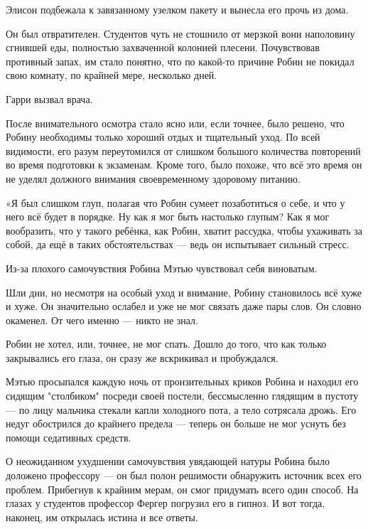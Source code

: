 \documentclass[a4paper,12pt]{book}
\begin{document}
\par
Элисон подбежала к завязанному узелком пакету и вынесла его прочь из дома.
\par
Он был отвратителен. Студентов чуть не стошнило от мерзкой вони наполовину сгнившей еды, полностью захваченной колонией плесени. Почувствовав противный запах, им стало понятно, что по какой-то причине Робин не покидал свою комнату, по крайней мере, несколько дней.
\par
Гарри вызвал врача.\\ 
\par
После внимательного осмотра стало ясно или, если точнее, было решено, что Робину необходимы только хороший отдых и тщательный уход. По всей видимости, его разум переутомился от слишком большого количества повторений во время подготовки к экзаменам. Кроме того, было похоже, что всё это время он не уделял должного внимания своевременному здоровому питанию.\\
\par
«Я был слишком глуп, полагая что Робин сумеет позаботиться о себе, и что у него всё будет в порядке. Ну как я мог быть настолько глупым? Как я мог вообразить, что у такого ребёнка, как Робин, хватит рассудка, чтобы ухаживать за собой, да ещё в таких обстоятельствах — ведь он испытывает сильный стресс.
\par
Из-за плохого самочувствия Робина Мэтью чувствовал себя виноватым.\\
\par
Шли дни, но несмотря на особый уход и внимание, Робину становилось всё хуже и хуже. Он значительно ослабел и уже не мог связать даже пары слов. Он словно окаменел. От чего именно — никто не знал.
\par
Робин не хотел, или, точнее, не мог спать. Дошло до того, что как только закрывались его глаза, он сразу же вскрикивал и пробуждался.
\par
Мэтью просыпался каждую ночь от пронзительных криков Робина и находил его сидящим "столбиком" посреди своей постели, бессмысленно глядящим в пустоту — по лицу мальчика стекали капли холодного пота, а тело сотрясала дрожь. Его недуг обострился до крайнего предела — теперь он больше не мог уснуть без помощи седативных средств.\\
\par
О неожиданном ухудшении самочувствия увядающей натуры Робина было доложено профессору — он был полон решимости обнаружить источник всех его проблем. Прибегнув к крайним мерам, он смог придумать всего один способ. На глазах у студентов профессор Фергер погрузил его в гипноз. И вот тогда, наконец, им открылась истина и все ответы.
\end{document}
